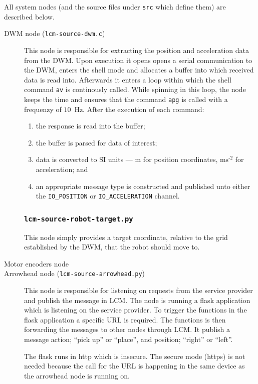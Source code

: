 All system nodes (and the source files under \texttt{src} which define them) are described below.
\begin{description}
\item[DWM node (\texttt{lcm-source-dwm.c})]
This node is responsible for extracting the position and acceleration data from the DWM.
Upon execution it opens opens a serial communication to the DWM, enters the shell mode and allocates a buffer into which received data is read into.
Afterwards it enters a loop within which the shell command \texttt{av} is continously called.
While spinning in this loop, the node keeps the time and ensures that the command \texttt{apg} is called with a frequenzy of $10$~Hz.
After the execution of each command:
\begin{enumerate}
  \item the response is read into the buffer;
  \item the buffer is parsed for data of interest;
  \item data is converted to SI units --- m for position coordinates, $\text{ms}^{\text{-2}}$ for acceleration; and
  \item an appropriate message type is constructed and published unto either the \texttt{IO\_POSITION} or \texttt{IO\_ACCELERATION} channel.
\end{enumerate}


\subsubsection{\texttt{lcm-source-robot-target.py}}
This node simply provides a target coordinate, relative to the grid established by the DWM, that the robot should move to.

\item[Motor encoders node]

\item[Arrowhead node (\texttt{lcm-source-arrowhead.py})]
  This node is responsible for listening on requests from the service provider and publish the message in LCM.
  The node is running a flask application which is listening on the service provider. 
  To trigger the functions in the flask application a specific URL is required.
  The functions is then forwarding the messages to other nodes through LCM.
  It publish a message action; ``pick up'' or ``place'', and position; ``right'' or ``left''.
  
  The flask runs in http which is insecure. 
  The secure mode (https) is not needed because the call for the URL is happening in the same device as the arrowhead node is running on.


\end{description}
